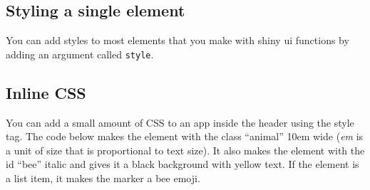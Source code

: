 \documentclass[
]{book}
\newenvironment{Shaded}{\begin{snugshade}}{\end{snugshade}}
\newcommand{\AttributeTok}[1]{\textcolor[rgb]{0.77,0.63,0.00}{#1}}
\newcommand{\FunctionTok}[1]{\textcolor[rgb]{0.00,0.00,0.00}{#1}}
\newcommand{\NormalTok}[1]{#1}
\newcommand{\SpecialCharTok}[1]{\textcolor[rgb]{0.00,0.00,0.00}{#1}}
\newcommand{\StringTok}[1]{\textcolor[rgb]{0.31,0.60,0.02}{#1}}
\begin{document}
\hypertarget{styling-a-single-element}{%
\subsection{Styling a single element}\label{styling-a-single-element}}

You can add styles to most elements that you make with shiny ui functions by adding an argument called \texttt{style}.

\begin{Shaded}
\end{Shaded}

\hypertarget{inline-css}{%
\subsection{Inline CSS}\label{inline-css}}

You can add a small amount of CSS to an app inside the header using the style tag. The code below makes the element with the class ``animal'' 10em wide (\emph{em} is a unit of size that is proportional to text size). It also makes the element with the id ``bee'' italic and gives it a black background with yellow text. If the element is a list item, it makes the marker a bee emoji.
\end{document}
